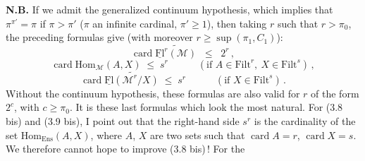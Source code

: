 \documentclass[11pt]{article}
\newcommand{\uFl}{\underline{\mathrm{Fl}}}
\newcommand{\Filt}{\mathrm{Filt}}
\newcommand{\cM}{\mathcal{M}}
\newcommand{\card}{\operatorname{card}}
\begin{document}
\textbf{N.B.} If we admit the generalized continuum hypothesis, which implies that $\pi^{\pi'}=\pi$ if $\pi>\pi'$ ($\pi$ an infinite cardinal, $\pi'\geq1$), then taking $r$ such that $r>\pi_0$, the preceding formulas give (with moreover $r\geq\sup(\pi_1,C_1)$):
\[
\card\widetilde{\uFl^r(\cM)} \;\;\leq\;\; 2^r\,,
\tag*{(3.7 bis)}
\]
\[
\card\mathrm{Hom}_{\cM}(A,X) \;\leq\; s^r \qquad\quad (\text{if } A\in\Filt^r,\ X\in\Filt^s)\,,
\tag*{(3.8 bis)}
\]
\[
\card\widetilde{\uFl(\cM^r/X)} \;\leq\; s^r \qquad\quad (\text{if } X\in\Filt^s)\,.
\tag*{(3.9 bis)}
\]
Without the continuum hypothesis, these formulas are also valid for $r$ of the form $2^c$, with $c\geq\pi_0$. It is these last formulas which look the most natural. For (3.8 bis) and %
(3.9 bis), I point out that the right-hand side $s^r$ is the cardinality of the set $\mathrm{Hom}_{\mathrm{Ens}}(A,X)$, where $A$, $X$ are two sets such that $\card A=r$, $\card X=s$. We therefore cannot hope to improve (3.8 bis)\,! For the
\end{document}
